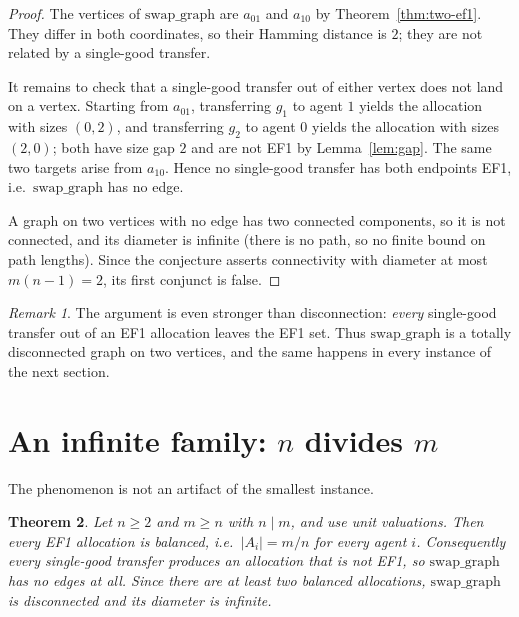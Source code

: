 \documentclass[11pt]{article}
\newtheorem{theorem}{Theorem}
\theoremstyle{definition}
\theoremstyle{remark}
\newtheorem{remark}[theorem]{Remark}
\newcommand{\swapgraph}{\mathrm{swap\_graph}}
\begin{document}
\begin{proof}
The vertices of $\swapgraph$ are $a_{01}$ and $a_{10}$ by
Theorem~\ref{thm:two-ef1}. They differ in both coordinates, so their Hamming
distance is $2$; they are not related by a single-good transfer.

It remains to check that a single-good transfer out of either vertex does not
land on a vertex. Starting from $a_{01}$, transferring $g_1$ to agent $1$ yields
the allocation with sizes $(0,2)$, and transferring $g_2$ to agent $0$ yields the
allocation with sizes $(2,0)$; both have size gap $2$ and are not EF1 by
Lemma~\ref{lem:gap}. The same two targets arise from $a_{10}$. Hence no
single-good transfer has both endpoints EF1, i.e.\ $\swapgraph$ has no edge.

A graph on two vertices with no edge has two connected components, so it is not
connected, and its diameter is infinite (there is no path, so no finite bound on
path lengths). Since the conjecture asserts connectivity with diameter at most
$m(n-1) = 2$, its first conjunct is false.
\end{proof}

\begin{remark}
The argument is even stronger than disconnection: \emph{every} single-good
transfer out of an EF1 allocation leaves the EF1 set. Thus $\swapgraph$ is a
totally disconnected graph on two vertices, and the same happens in every
instance of the next section.
\end{remark}

\section{An infinite family: $n$ divides $m$}

The phenomenon is not an artifact of the smallest instance.

\begin{theorem}\label{thm:family}
Let $n \ge 2$ and $m \ge n$ with $n \mid m$, and use unit valuations. Then every
EF1 allocation is balanced, i.e.\ $|A_i| = m/n$ for every agent $i$. Consequently
every single-good transfer produces an allocation that is not EF1, so
$\swapgraph$ has no edges at all. Since there are at least two balanced
allocations, $\swapgraph$ is disconnected and its diameter is infinite.
\end{theorem}
\end{document}
